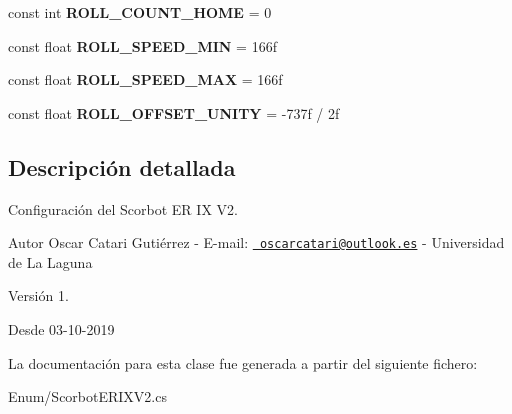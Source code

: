 \begin{DoxyCompactItemize}
const int {\bfseries R\+O\+L\+L\+\_\+\+C\+O\+U\+N\+T\+\_\+\+H\+O\+ME} = 0
\item 
\mbox{\label{class_scorbot_e_r_i_x_v2_a6bcf363cadd24599c59b9cf3f51ef31c}} 
const float {\bfseries R\+O\+L\+L\+\_\+\+S\+P\+E\+E\+D\+\_\+\+M\+IN} = 166f
\item 
\mbox{\label{class_scorbot_e_r_i_x_v2_a3e90974539c1d55578617c1d7f76f43a}} 
const float {\bfseries R\+O\+L\+L\+\_\+\+S\+P\+E\+E\+D\+\_\+\+M\+AX} = 166f
\item 
\mbox{\label{class_scorbot_e_r_i_x_v2_a87f87b2ec4193eaa1d69005c91dc0aed}} 
const float {\bfseries R\+O\+L\+L\+\_\+\+O\+F\+F\+S\+E\+T\+\_\+\+U\+N\+I\+TY} = -\/737f / 2f
\end{DoxyCompactItemize}


\subsection{Descripción detallada}
Configuración del Scorbot ER IX V2. \begin{DoxyAuthor}{Autor}
Oscar Catari Gutiérrez -\/ E-\/mail\+: \href{mailto:oscarcatari@outlook.es}{\texttt{ oscarcatari@outlook.\+es}} -\/ Universidad de La Laguna 
\end{DoxyAuthor}
\begin{DoxyVersion}{Versión}
1. 
\end{DoxyVersion}
\begin{DoxySince}{Desde}
03-\/10-\/2019 
\end{DoxySince}


La documentación para esta clase fue generada a partir del siguiente fichero\+:\begin{DoxyCompactItemize}
\item 
Enum/Scorbot\+E\+R\+I\+X\+V2.\+cs\end{DoxyCompactItemize}
